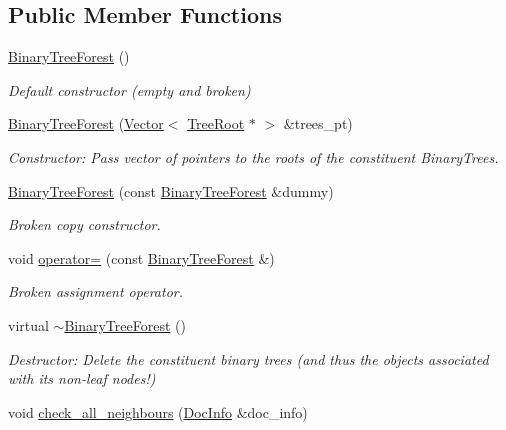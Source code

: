 \subsection*{Public Member Functions}
\begin{DoxyCompactItemize}
\item 
\hyperlink{classoomph_1_1BinaryTreeForest_a0185044e57a122d19fef2a5c9256a74b}{Binary\+Tree\+Forest} ()
\begin{DoxyCompactList}\small\item\em Default constructor (empty and broken) \end{DoxyCompactList}\item 
\hyperlink{classoomph_1_1BinaryTreeForest_a534e8527d8701034afb5a8d6ab343de2}{Binary\+Tree\+Forest} (\hyperlink{classoomph_1_1Vector}{Vector}$<$ \hyperlink{classoomph_1_1TreeRoot}{Tree\+Root} $\ast$ $>$ \&trees\+\_\+pt)
\begin{DoxyCompactList}\small\item\em Constructor\+: Pass vector of pointers to the roots of the constituent Binary\+Trees. \end{DoxyCompactList}\item 
\hyperlink{classoomph_1_1BinaryTreeForest_a15182098b581aa96b00a4f155c85cc8c}{Binary\+Tree\+Forest} (const \hyperlink{classoomph_1_1BinaryTreeForest}{Binary\+Tree\+Forest} \&dummy)
\begin{DoxyCompactList}\small\item\em Broken copy constructor. \end{DoxyCompactList}\item 
void \hyperlink{classoomph_1_1BinaryTreeForest_a85517fbf448db0f571972d9c389ce6dd}{operator=} (const \hyperlink{classoomph_1_1BinaryTreeForest}{Binary\+Tree\+Forest} \&)
\begin{DoxyCompactList}\small\item\em Broken assignment operator. \end{DoxyCompactList}\item 
virtual \hyperlink{classoomph_1_1BinaryTreeForest_a6aa265e1c1c5b3be62b2f79d7c13c306}{$\sim$\+Binary\+Tree\+Forest} ()
\begin{DoxyCompactList}\small\item\em Destructor\+: Delete the constituent binary trees (and thus the objects associated with its non-\/leaf nodes!) \end{DoxyCompactList}\item 
void \hyperlink{classoomph_1_1BinaryTreeForest_a2e99234fcdc75760e00afb7d140c74ec}{check\+\_\+all\+\_\+neighbours} (\hyperlink{classoomph_1_1DocInfo}{Doc\+Info} \&doc\+\_\+info)

\end{DoxyCompactItemize}
